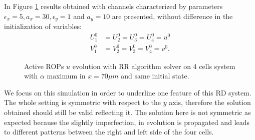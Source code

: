 In Figure \ref{fig:4c_gradmid_sameI} results obtained with channels characterized by parameters $\epsilon_x = 5,  a_x = 30,  \epsilon_y = 1$ and $a_y = 10$ are presented, without difference in the initialization of variables:
\begin{equation*}\begin{aligned}
  U_1^0 & = U_2^0 = U_3^0 = U_4^0 = u^0 \\
  V_1^0 & = V_2^0 = V_3^0 = V_4^0 = v^0.
\end{aligned}\end{equation*}

\begin{figure}[t]
    \centering
    \quad
    \quad
    \quad
    \quad
    \caption[4cell RR Active ROPs - mid gradient, same initial state]{Active ROPs $u$ evolution with RR algorithm solver on 4 cells system with $\alpha$ maximum in $x = 70 \mu m$ and same initial state.}
    \label{fig:4c_gradmid_sameI}
\end{figure}
We focus on this simulation in order to underline one feature of this RD system. The whole setting is symmetric with respect to the $y$ axis, therefore the solution obtained should still be valid reflecting it. The solution here is not symmetric as expected because the slightly imperfection, in evolution is propagated and leads to different patterns between the right and left side of the four cells.

